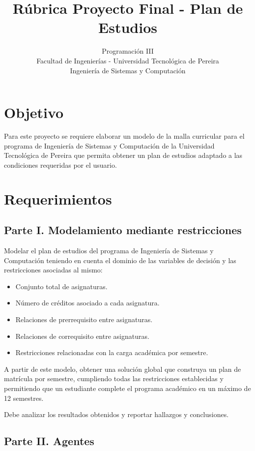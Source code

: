 \documentclass{article}
\title{Rúbrica Proyecto Final - Plan de Estudios}
\author{Programación III \\ Facultad de Ingenierías - Universidad Tecnológica de Pereira \\ Ingeniería de Sistemas y Computación}
\date{}
\begin{document}
\maketitle
\thispagestyle{empty}

\section{Objetivo}

Para este proyecto se requiere elaborar un modelo de la malla curricular para el programa de Ingeniería de Sistemas y Computación de la Universidad Tecnológica de Pereira que permita obtener un plan de estudios adaptado a las condiciones requeridas por el usuario.

\section{Requerimientos}

\subsection{Parte I. Modelamiento mediante restricciones}
Modelar el plan de estudios del programa de Ingeniería de Sistemas y Computación teniendo en cuenta el dominio de las variables de decisión y las restricciones asociadas al mismo:

\begin{itemize}
    \item Conjunto total de asignaturas.
    \item Número de créditos asociado a cada asignatura.
    \item Relaciones de prerrequisito entre asignaturas.
    \item Relaciones de correquisito entre asignaturas.
    \item Restricciones relacionadas con la carga académica por semestre.
\end{itemize}


A partir de este modelo, obtener una solución global que construya un plan de matrícula por semestre, cumpliendo todas las restricciones establecidas y permitiendo que un estudiante complete el programa académico en un máximo de 12 semestres.

Debe analizar los resultados obtenidos y reportar hallazgos y conclusiones.

\subsection{Parte II. Agentes}
\end{document}

